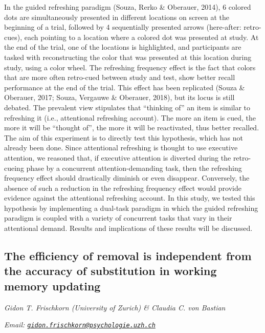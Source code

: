\documentclass[12pt,]{book}
\begin{document}
In the guided refreshing paradigm (Souza, Rerko \& Oberauer, 2014), 6 colored dots are simultaneously presented in different locations on screen at the beginning of a trial, followed by 4 sequentially presented arrows (here-after: retro-cues), each pointing to a location where a colored dot was presented at study. At the end of the trial, one of the locations is highlighted, and participants are tasked with reconstructing the color that was presented at this location during study, using a color wheel. The refreshing frequency effect is the fact that colors that are more often retro-cued between study and test, show better recall performance at the end of the trial. This effect has been replicated (Souza \& Oberauer, 2017; Souza, Vergauwe \& Oberauer, 2018), but its locus is still debated. The prevalent view stipulates that ``thinking of'' an item is similar to refreshing it (i.e., attentional refreshing account). The more an item is cued, the more it will be ``thought of'', the more it will be reactivated, thus better recalled. The aim of this experiment is to directly test this hypothesis, which has not already been done. Since attentional refreshing is thought to use executive attention, we reasoned that, if executive attention is diverted during the retro-cueing phase by a concurrent attention-demanding task, then the refreshing frequency effect should drastically diminish or even disappear. Conversely, the absence of such a reduction in the refreshing frequency effect would provide evidence against the attentional refreshing account. In this study, we tested this hypothesis by implementing a dual-task paradigm in which the guided refreshing paradigm is coupled with a variety of concurrent tasks that vary in their attentional demand. Results and implications of these results will be discussed.

\hypertarget{the-efficiency-of-removal-is-independent-from-the-accuracy-of-substitution-in-working-memory-updating}{%
\subsection{The efficiency of removal is independent from the accuracy of substitution in working memory updating}\label{the-efficiency-of-removal-is-independent-from-the-accuracy-of-substitution-in-working-memory-updating}}

\emph{Gidon T. Frischkorn (University of Zurich) \& Claudia C. von Bastian}

\emph{Email: \href{mailto:gidon.frischkorn@psychologie.uzh.ch}{\nolinkurl{gidon.frischkorn@psychologie.uzh.ch}}}
\end{document}
